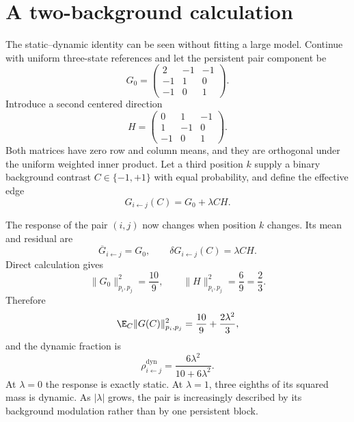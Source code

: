 \section*{A two-background calculation}

The static--dynamic identity can be seen without fitting a large model.  Continue with uniform
three-state references and let the persistent pair component be
\begin{equation}
G_0=
\begin{pmatrix}
2&-1&-1\\
-1&1&0\\
-1&0&1
\end{pmatrix}.
\end{equation}
Introduce a second centered direction
\begin{equation}
H=
\begin{pmatrix}
0&1&-1\\
1&-1&0\\
-1&0&1
\end{pmatrix}.
\end{equation}
Both matrices have zero row and column means, and they are orthogonal under the uniform weighted
inner product.  Let a third position $k$ supply a binary background contrast $C\in\{-1,+1\}$ with
equal probability, and define the effective edge
\begin{equation}
G_{i\leftarrow j}(C)=G_0+\lambda C H.
\label{eq:book-two-background-edge}
\end{equation}

The response of the pair $(i,j)$ now changes when position $k$ changes.  Its mean and residual are
\begin{equation}
\overline G_{i\leftarrow j}=G_0,
\qquad
\delta G_{i\leftarrow j}(C)=\lambda C H.
\end{equation}
Direct calculation gives
\begin{equation}
\|G_0\|_{p_i,p_j}^2=\frac{10}{9},
\qquad
\|H\|_{p_i,p_j}^2=\frac{6}{9}=\frac23.
\end{equation}
Therefore
\begin{equation}
\E_C\|G(C)\|_{p_i,p_j}^2
=\frac{10}{9}+\frac{2\lambda^2}{3},
\end{equation}
and the dynamic fraction is
\begin{equation}
\rho_{i\leftarrow j}^{\mathrm{dyn}}
=\frac{6\lambda^2}{10+6\lambda^2}.
\label{eq:book-two-background-rho}
\end{equation}
At $\lambda=0$ the response is exactly static.  At $\lambda=1$, three eighths of its squared mass
is dynamic.  As $|\lambda|$ grows, the pair is increasingly described by its background modulation
rather than by one persistent block.

